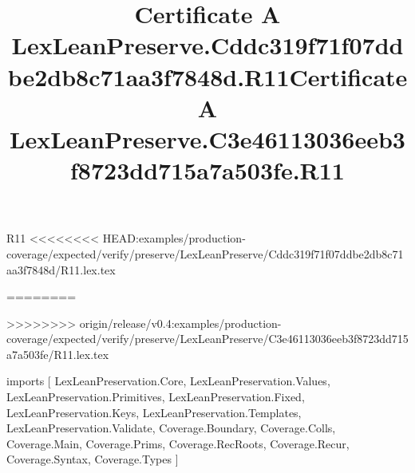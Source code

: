 \begin{lexlean}{R11}
<<<<<<<< HEAD:examples/production-coverage/expected/verify/preserve/LexLeanPreserve/Cddc319f71f07ddbe2db8c71aa3f7848d/R11.lex.tex
\title{Certificate A LexLeanPreserve.Cddc319f71f07ddbe2db8c71aa3f7848d.R11}
========
\title{Certificate A LexLeanPreserve.C3e46113036eeb3f8723dd715a7a503fe.R11}
>>>>>>>> origin/release/v0.4:examples/production-coverage/expected/verify/preserve/LexLeanPreserve/C3e46113036eeb3f8723dd715a7a503fe/R11.lex.tex
\begin{coremodule}
imports [
  LexLeanPreservation.Core,
  LexLeanPreservation.Values,
  LexLeanPreservation.Primitives,
  LexLeanPreservation.Fixed,
  LexLeanPreservation.Keys,
  LexLeanPreservation.Templates,
  LexLeanPreservation.Validate,
  Coverage.Boundary,
  Coverage.Colls,
  Coverage.Main,
  Coverage.Prims,
  Coverage.RecRoots,
  Coverage.Recur,
  Coverage.Syntax,
  Coverage.Types
]


\end{coremodule}
\end{lexlean}
